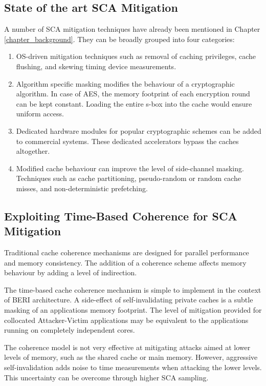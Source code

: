 	\subsection{State of the art SCA Mitigation}
		A number of SCA mitigation techniques have already been mentioned in Chapter \ref{chapter_background}. They can be broadly grouped into four categories: 
		
		\begin{enumerate}
			\item OS-driven mitigation techniques such as removal of caching privileges, cache flushing, and skewing timing device measurements.
			\item Algorithm specific masking modifies the behaviour of a cryptographic algorithm. In case of AES, the memory footprint of each encryption round can be kept constant. Loading the entire s-box into the cache would ensure uniform access.
			\item Dedicated hardware modules for popular cryptographic schemes can be added to commercial systems. These dedicated accelerators bypass the caches altogether.
			\item Modified cache behaviour can improve the level of side-channel masking. Techniques such as cache partitioning, pseudo-random or random cache misses, and non-deterministic prefetching.
		\end{enumerate}
	
	\subsection{Exploiting Time-Based Coherence for SCA Mitigation}
		Traditional cache coherence mechanisms are designed for parallel performance and memory consistency. The addition of a coherence scheme affects memory behaviour by adding a level of indirection.
		
		The time-based cache coherence mechanism is simple to implement in the context of BERI architecture. A side-effect of self-invalidating private caches is a subtle masking of an applications memory footprint. The level of mitigation provided for collocated Attacker-Victim applications may be equivalent to the applications running on completely independent cores.
		
		The coherence model is not very effective at mitigating attacks aimed at lower levels of memory, such as the shared cache or main memory. However, aggressive self-invalidation adds noise to time measurements when attacking the lower levels. This uncertainty can be overcome through higher SCA sampling. 
	
